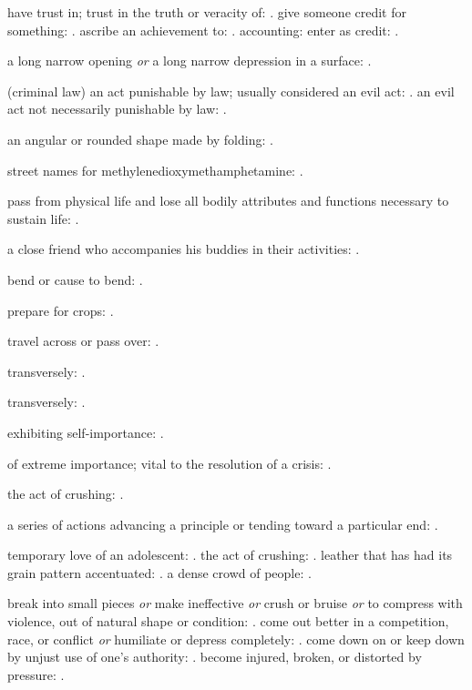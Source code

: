   have trust in; trust in the truth or veracity of: . give someone credit for something: . ascribe an achievement to: . accounting: enter as credit: .

  a long narrow opening \textit{or} a long narrow depression in a surface: .

  (criminal law) an act punishable by law; usually considered an evil act: . an evil act not necessarily punishable by law: .

  an angular or rounded shape made by folding: .

  street names for methylenedioxymethamphetamine: .

  pass from physical life and lose all bodily attributes and functions necessary to sustain life: .

  a close friend who accompanies his buddies in their activities: .

  bend or cause to bend: .

  prepare for crops: .

  travel across or pass over: .

  transversely: .

  transversely: .

  exhibiting self-importance: .

  of extreme importance; vital to the resolution of a crisis: .

  the act of crushing: .

  a series of actions advancing a principle or tending toward a particular end: .

  temporary love of an adolescent: . the act of crushing: . leather that has had its grain pattern accentuated: . a dense crowd of people: .

  break into small pieces \textit{or} make ineffective \textit{or} crush or bruise \textit{or} to compress with violence, out of natural shape or condition: . come out better in a competition, race, or conflict \textit{or} humiliate or depress completely: . come down on or keep down by unjust use of one's authority: . become injured, broken, or distorted by pressure: .


